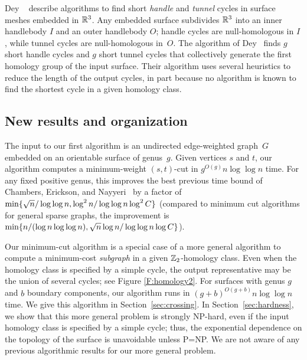 Dey \etal~\cite{dls-chtl-07, dlsc-cgaht-08} describe algorithms to find short \emph{handle} and \emph{tunnel} cycles in surface meshes embedded in $\mathbb{R}^3$.  Any embedded surface subdivides $\mathbb{R}^3$ into an inner handlebody $I$ and an outer handlebody $O$; handle cycles are null-homologous in $I$, while tunnel cycles are null-homologous in~$O$.  The algorithm of Dey \etal\ finds $g$ short handle cycles and $g$ short tunnel cycles that collectively generate the first homology group of the input surface.  Their algorithm uses several heuristics to reduce the length of the output cycles, in part because no algorithm is known to find the shortest cycle in a given homology class.

\subsection{New results and organization}
The input to our first algorithm is an undirected edge-weighted graph~$G$ embedded on an orientable surface of genus~$g$.  Given vertices $s$ and $t$, our algorithm computes a minimum-weight $(s,t)$-cut in $g^{O(g)}n\log \log n$ time.
For any fixed positive genus, this improves the best previous time bound of Chambers, Erickson, and Nayyeri~\cite{cen-hfcc-12} by a factor of $\min\{  \sqrt{n} / \log \log n, \log^2 n / \log \log n \log^2 C \}$ (compared to minimum cut algorithms for general sparse graphs, the improvement is $\min\{ n / ( \log n \log \log n), \sqrt{n} \log n / \log \log n \log C \}$).

Our minimum-cut algorithm is a special case of a more general algorithm to compute a minimum-cost \emph{subgraph} in a given $\mathbb{Z}_2$-homology class.  Even when the homology class is specified by a simple cycle, the output representative may be the union of several cycles; see Figure \ref{F:homology2}.  For surfaces with genus $g$ and $b$ boundary components, our algorithm runs in $(g+b)^{O(g+b)}n\log\log n$ time.
We give this algorithm in Section~\ref{sec:crossing}.
In Section~\ref{sec:hardness}, we show that this more general problem is strongly NP-hard, even if the input homology class is specified by a simple cycle; thus, the exponential dependence on the topology of the surface is unavoidable unless {P}={NP}.  We are not aware of any previous algorithmic results for our more general problem.

